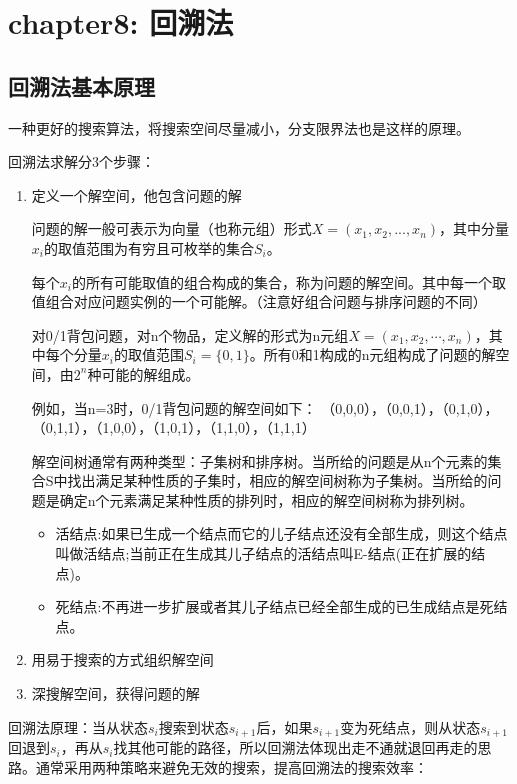 \documentclass[./../main.tex]{subfiles}
\begin{document}
\section{chapter8: 回溯法}
\subsection{回溯法基本原理}
一种更好的搜索算法，将搜索空间尽量减小，分支限界法也是这样的原理。

回溯法求解分3个步骤：
\begin{enumerate}
    \item 定义一个解空间，他包含问题的解

    问题的解一般可表示为向量（也称元组）形式$X=(x_{1},x_{2},...,x_{n})$，其中分量$x_{i}$的取值范围为有穷且可枚举的集合$S_{i}$。

    每个$x_{i}$的所有可能取值的组合构成的集合，称为问题的解空间。其中每一个取值组合对应问题实例的一个可能解。（注意好组合问题与排序问题的不同）

    对0/1背包问题，对n个物品，定义解的形式为n元组$X=(x_{1},x_{2},\cdots,x_{n})$，其中每个分量$x_{i}$的取值范围$S_{i}=\{0,1\}$。所有0和1构成的n元组构成了问题的解空间，由$2^{n}$种可能的解组成。

    例如，当n=3时，0/1背包问题的解空间如下：
    {（0,0,0），（0,0,1），（0,1,0），（0,1,1），（1,0,0），（1,0,1），（1,1,0），（1,1,1）}

    解空间树通常有两种类型：子集树和排序树。当所给的问题是从n个元素的集合S中找出满⾜某种性质的⼦集时，相应的解空间树称为⼦集树。当所给的问题是确定n个元素满⾜某种性质的排列时，相应的解空间树称为排列树。

    \begin{itemize}
        \item 活结点:如果已生成一个结点而它的儿子结点还没有全部生成，则这个结点叫做活结点;当前正在生成其儿子结点的活结点叫E-结点(正在扩展的结点)。
        \item 死结点:不再进一步扩展或者其儿子结点已经全部生成的已生成结点是死结点。
    \end{itemize}
    \item 用易于搜索的方式组织解空间
    \item 深搜解空间，获得问题的解
\end{enumerate}

回溯法原理：当从状态$s_{i}$搜索到状态$s_{i+1}$后，如果$s_{i+1}$变为死结点，则从状态$s_{i+1}$回退到$s_{i}$，再从$s_{i}$找其他可能的路径，所以回溯法体现出走不通就退回再走的思路。通常采用两种策略来避免无效的搜索，提高回溯法的搜索效率：
\end{document}
